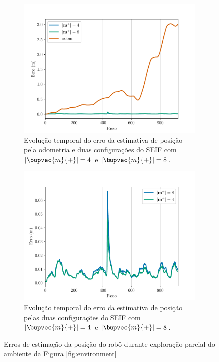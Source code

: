 \begin{figure}
  \centering
  \begin{subfigure}{.75\textwidth}
    \includegraphics[width=\textwidth]{figs/iae-odom-seif.pdf} 
    \caption{Evolução temporal do erro da estimativa de posição pela odometria e duas configurações do SEIF com $\lvert \bupvec{m}{+}\rvert = 4 $ e $\lvert \bupvec{m}{+}\rvert = 8 $.}
    \label{fig:iae-odom-and-seifs}
  \end{subfigure}
  \begin{subfigure}{.75\textwidth}
    \includegraphics[width=\textwidth]{figs/iae-seifs.pdf} 
    \caption{Evolução temporal do erro da estimativa de posição pelas duas configurações do SEIF com $\lvert \bupvec{m}{+}\rvert = 4 $ e $\lvert \bupvec{m}{+}\rvert = 8 $.}
    \label{fig:iae-seifs}
  \end{subfigure}
  \caption[Erros de estimação da posição do robô no experimento SEIF vs Odometria]{Erros de estimação da posição do robô durante exploração parcial do ambiente da Figura \ref{fig:environment}}
  \label{fig:iae}
\end{figure}

